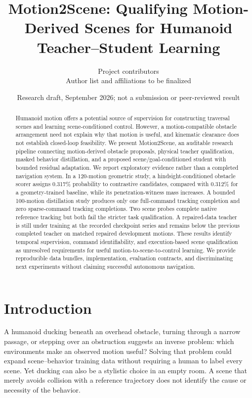 \documentclass[10pt,twocolumn]{article}
\title{Motion2Scene: Qualifying Motion-Derived Scenes for Humanoid Teacher--Student Learning}
\author{Project contributors\\\small Author list and affiliations to be finalized}
\date{Research draft, September 2026; not a submission or peer-reviewed result}
\begin{document}
\maketitle
\begin{abstract}
Humanoid motion offers a potential source of supervision for constructing traversal scenes and learning scene-conditioned control. However, a motion-compatible obstacle arrangement need not explain why that motion is useful, and kinematic clearance does not establish closed-loop feasibility. We present Motion2Scene, an auditable research pipeline connecting motion-derived obstacle proposals, physical teacher qualification, masked behavior distillation, and a proposed scene/goal-conditioned student with bounded residual adaptation. We report exploratory evidence rather than a completed navigation system. In a 120-motion geometric study, a hindsight-conditioned obstacle scorer assigns 0.317\% probability to contrastive candidates, compared with 0.312\% for a geometry-trained baseline, while its penetration-witness mass increases. A bounded 100-motion distillation study produces only one full-command tracking completion and zero sparse-command tracking completions. Two scene probes complete native reference tracking but both fail the stricter task qualification. A repaired-data teacher is still under training at the recorded checkpoint series and remains below the previous completed teacher on matched repaired development motions. These results identify temporal supervision, command identifiability, and execution-based scene qualification as unresolved requirements for useful motion-to-scene-to-control learning. We provide reproducible data bundles, implementation, evaluation contracts, and discriminating next experiments without claiming successful autonomous navigation.
\end{abstract}

\section{Introduction}
A humanoid ducking beneath an overhead obstacle, turning through a narrow passage, or stepping over an obstruction suggests an inverse problem: which environments make an observed motion useful? Solving that problem could expand scene--behavior training data without requiring a human to label every scene. Yet ducking can also be a stylistic choice in an empty room. A scene that merely avoids collision with a reference trajectory does not identify the cause or necessity of the behavior.
\end{document}
